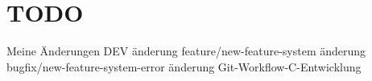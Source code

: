 \chapter{TODO}
\hypertarget{md__t_o_d_o}{}\label{md__t_o_d_o}
Meine Änderungen DEV änderung feature/new-\/feature-\/system änderung bugfix/new-\/feature-\/system-\/error änderung Git-\/\+Workflow-\/\+C-\/\+Entwicklung 